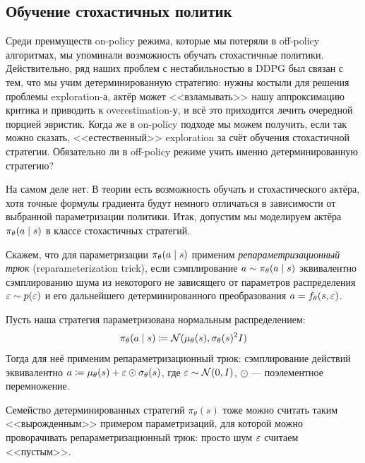 \subsection{Обучение стохастичных политик}\label{subsec:stochpolicies}

Среди преимуществ on-policy режима, которые мы потеряли в off-policy алгоритмах, мы упоминали возможность обучать стохастичные политики. Действительно, ряд наших проблем с нестабильностью в DDPG был связан с тем, что мы учим детерминированную стратегию: нужны костыли для решения проблемы exploration-а, актёр может <<взламывать>> нашу аппроксимацию критика и приводить к overestimation-у, и всё это приходится лечить очередной порцией эвристик. Когда же в on-policy подходе мы можем получить, если так можно сказать, <<естественный>> exploration за счёт обучения стохастичной стратегии. Обязательно ли в off-policy режиме учить именно детерминированную стратегию?

На самом деле нет. В теории есть возможность обучать и стохастического актёра, хотя точные формулы градиента будут немного отличаться в зависимости от выбранной параметризации политики. Итак, допустим мы моделируем актёра $\pi_\theta(a \HM\mid s)$ в классе стохастичных стратегий.

\begin{definition}
Скажем, что для параметризации $\pi_\theta(a \HM\mid s)$ применим \emph{репараметризационный трюк} (reparameterization trick), если сэмплирование $a \HM\sim \pi_\theta(a \mid s)$ эквивалентно сэмплированию шума из некоторого не зависящего от параметров распределения $\eps \HM\sim p(\eps)$ и его дальнейшего детерминированного преобразования $a \HM= f_{\theta}(s, \eps)$.
\end{definition}

\begin{exampleBox}[label=ex:gaussian_policy]{}
Пусть наша стратегия параметризована нормальным распределением:
$$\pi_\theta(a \HM\mid s) \HM\coloneqq \N(\mu_\theta(s), \sigma_\theta(s)^2I)$$
Тогда для неё применим репараметризационный трюк: сэмплирование действий эквивалентно $a \coloneqq \mu_\theta(s) \HM+ \eps \HM\odot \sigma_\theta(s)$, где $\eps \HM\sim \N(0, I)$, $\odot$ --- поэлементное перемножение.
\end{exampleBox}

\begin{example}
Семейство детерминированных стратегий $\pi_\theta(s)$ тоже можно считать таким <<вырожденным>> примером параметризаций, для которой можно проворачивать репараметризационный трюк: просто шум $\varepsilon$ считаем <<пустым>>.
\end{example}

